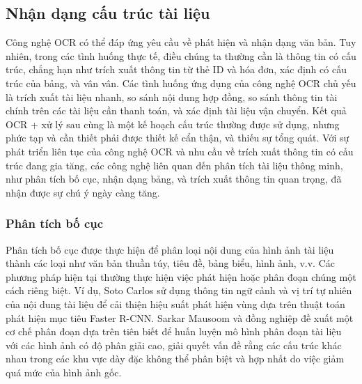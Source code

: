 \subsection{Nhận dạng cấu trúc tài liệu}
Công nghệ OCR có thể đáp ứng yêu cầu về phát hiện và nhận dạng văn bản. Tuy nhiên, trong các tình huống thực tế, điều chúng ta thường cần là thông tin có cấu trúc, chẳng hạn như trích xuất thông tin từ thẻ ID và hóa đơn, xác định có cấu trúc của bảng, và vân vân. Các tình huống ứng dụng của công nghệ OCR chủ yếu là trích xuất tài liệu nhanh, so sánh nội dung hợp đồng, so sánh thông tin tài chính trên các tài liệu cần thanh toán, và xác định tài liệu vận chuyển. Kết quả OCR + xử lý sau cùng là một kế hoạch cấu trúc thường được sử dụng, nhưng phức tạp và cần thiết phải được thiết kế cẩn thận, và thiếu sự tổng quát. Với sự phát triển liên tục của công nghệ OCR và nhu cầu về trích xuất thông tin có cấu trúc đang gia tăng, các công nghệ liên quan đến phân tích tài liệu thông minh, như phân tích bố cục, nhận dạng bảng, và trích xuất thông tin quan trọng, đã nhận được sự chú ý ngày càng tăng. \cite{Dive-into-ocr-2022}

\subsubsection*{Phân tích bố cục}
Phân tích bố cục được thực hiện để phân loại nội dung của hình ảnh tài liệu thành các loại như văn bản thuần túy, tiêu đề, bảng biểu, hình ảnh, v.v. Các phương pháp hiện tại thường thực hiện việc phát hiện hoặc phân đoạn chúng một cách riêng biệt. Ví dụ, Soto Carlos sử dụng thông tin ngữ cảnh và vị trí tự nhiên của nội dung tài liệu để cải thiện hiệu suất phát hiện vùng dựa trên thuật toán phát hiện mục tiêu Faster R-CNN. Sarkar Mausoom và đồng nghiệp đề xuất một cơ chế phân đoạn dựa trên tiên biết để huấn luyện mô hình phân đoạn tài liệu với các hình ảnh có độ phân giải cao, giải quyết vấn đề rằng các cấu trúc khác nhau trong các khu vực dày đặc không thể phân biệt và hợp nhất do việc giảm quá mức của hình ảnh gốc.

